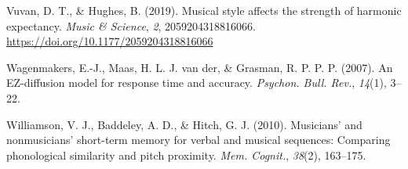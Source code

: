 \documentclass[english,man,floatsintext]{apa6}
\begin{document}
\leavevmode\hypertarget{ref-Vuvan_undated-zi}{}%
Vuvan, D. T., \& Hughes, B. (2019). Musical style affects the strength of harmonic expectancy. \emph{Music \& Science}, \emph{2}, 2059204318816066. \url{https://doi.org/10.1177/2059204318816066}

\leavevmode\hypertarget{ref-Wagenmakers2007-qf}{}%
Wagenmakers, E.-J., Maas, H. L. J. van der, \& Grasman, R. P. P. P. (2007). An EZ-diffusion model for response time and accuracy. \emph{Psychon. Bull. Rev.}, \emph{14}(1), 3--22.

\leavevmode\hypertarget{ref-Williamson2010-dw}{}%
Williamson, V. J., Baddeley, A. D., \& Hitch, G. J. (2010). Musicians' and nonmusicians' short-term memory for verbal and musical sequences: Comparing phonological similarity and pitch proximity. \emph{Mem. Cognit.}, \emph{38}(2), 163--175.

\endgroup
\end{document}
